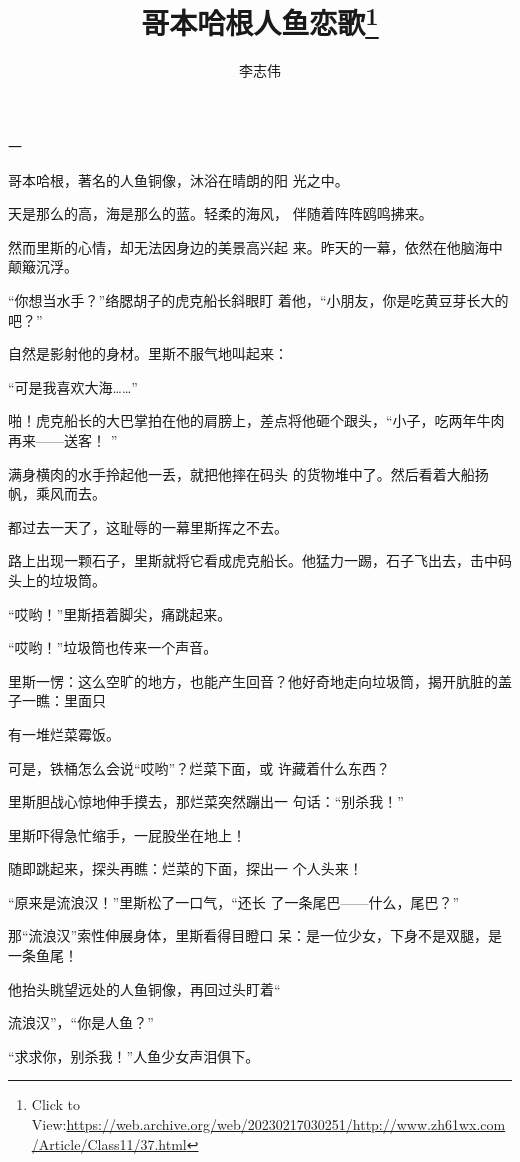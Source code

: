 \documentclass{article}
\title{哥本哈根人鱼恋歌\footnote{Click to View:\url{https://web.archive.org/web/20230217030251/http://www.zh61wx.com/Article/Class11/37.html}}}
\author{李志伟}
\date{}
\begin{document}

\maketitle


\Large


﻿一 

哥本哈根，著名的人鱼铜像，沐浴在晴朗的阳
光之中。 

天是那么的高，海是那么的蓝。轻柔的海风，
伴随着阵阵鸥鸣拂来。 

然而里斯的心情，却无法因身边的美景高兴起
来。昨天的一幕，依然在他脑海中颠簸沉浮。 

“你想当水手？”络腮胡子的虎克船长斜眼盯
着他，“小朋友，你是吃黄豆芽长大的吧？” 

自然是影射他的身材。里斯不服气地叫起来：
\newpage

“可是我喜欢大海……” 

啪！虎克船长的大巴掌拍在他的肩膀上，差点将他砸个跟头，“小子，吃两年牛肉再来——送客！
” 

满身横肉的水手拎起他一丢，就把他摔在码头
的货物堆中了。然后看着大船扬帆，乘风而去。 

都过去一天了，这耻辱的一幕里斯挥之不去。
 

路上出现一颗石子，里斯就将它看成虎克船长。他猛力一踢，石子飞出去，击中码头上的垃圾筒。


“哎哟！”里斯捂着脚尖，痛跳起来。 


“哎哟！”垃圾筒也传来一个声音。 

里斯一愣：这么空旷的地方，也能产生回音？他好奇地走向垃圾筒，揭开肮脏的盖子一瞧：里面只
\newpage

有一堆烂菜霉饭。 

可是，铁桶怎么会说“哎哟”？烂菜下面，或
许藏着什么东西？ 

里斯胆战心惊地伸手摸去，那烂菜突然蹦出一
句话：“别杀我！” 


里斯吓得急忙缩手，一屁股坐在地上！ 

随即跳起来，探头再瞧：烂菜的下面，探出一
个人头来！ 

“原来是流浪汉！”里斯松了一口气，“还长
了一条尾巴——什么，尾巴？” 

那“流浪汉”索性伸展身体，里斯看得目瞪口
呆：是一位少女，下身不是双腿，是一条鱼尾！ 

他抬头眺望远处的人鱼铜像，再回过头盯着“

\newpage
流浪汉”，“你是人鱼？” 


“求求你，别杀我！”人鱼少女声泪俱下。 
\end{document}
